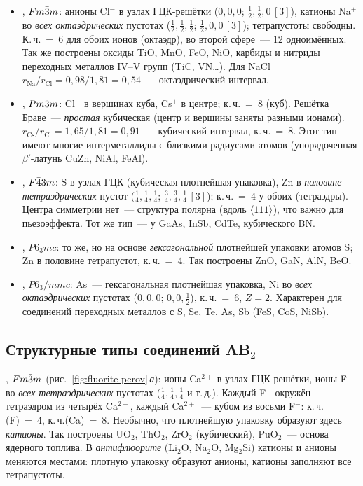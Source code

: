\begin{itemize}
\item {}, $Fm\bar{3}m$: анионы Cl$^-$ в узлах ГЦК-решётки ($0,0,0$;
$\frac12,\frac12,0\,[3]$), катионы Na$^+$ во \emph{всех октаэдрических} пустотах
($\frac12,\frac12,\frac12$; $\frac12,0,0\,[3]$); тетрапустоты свободны. К.\,ч.~=~6 для
обоих ионов (октаэдр), во второй сфере~— 12 одноимённых. Так же построены
оксиды TiO, MnO, FeO, NiO, карбиды и нитриды переходных металлов IV--V
групп (TiC, VN\ldots). Для NaCl $r_\text{Na}/r_\text{Cl}=0{,}98/1{,}81=0{,}54$~—
октаэдрический интервал.
\item {}, $Pm\bar{3}m$: Cl$^-$ в вершинах куба, Cs$^+$ в центре;
к.\,ч.~=~8 (куб). Решётка Браве~— \emph{простая} кубическая (центр и вершины
заняты разными ионами). $r_\text{Cs}/r_\text{Cl}=1{,}65/1{,}81=0{,}91$~— кубический
интервал, к.\,ч.~=~8. Этот тип имеют многие
интерметаллиды с близкими радиусами атомов (упорядоченная $\beta'$-латунь
CuZn, NiAl, FeAl).
\item {}, $F\bar{4}3m$: S в узлах ГЦК (кубическая плотнейшая
упаковка), Zn в \emph{половине тетраэдрических} пустот ($\frac14,\frac14,\frac14$;
$\frac34,\frac34,\frac14\,[3]$); к.\,ч.~=~4 у обоих (тетраэдры). Центра симметрии нет~—
структура полярна (вдоль $\langle 111\rangle$), что важно для пьезоэффекта. Тот же
тип~— у GaAs, InSb, CdTe, кубического BN.
\item {}, $P6_3mc$: то же, но на основе
\emph{гексагональной} плотнейшей упаковки атомов S; Zn в половине
тетрапустот, к.\,ч.~=~4. Так построены ZnO, GaN, AlN, BeO.
\item {}, $P6_3/mmc$: As~— гексагональная плотнейшая упаковка,
Ni во \emph{всех октаэдрических} пустотах ($0,0,0$; $0,0,\frac12$), к.\,ч.~=~6, $Z=2$.
Характерен для соединений переходных металлов с S, Se, Te, As, Sb (FeS, CoS,
NiSb).
\end{itemize}

\subsection{Структурные типы соединений AB$_2$}\label{ssec:ab2-types}

, $Fm\bar{3}m$ (рис.~\ref{fig:fluorite-perov}\,\textit{а}):
ионы Ca$^{2+}$ в узлах ГЦК-решётки, ионы F$^-$ во \emph{всех тетраэдрических}
пустотах ($\frac14,\frac14,\frac14$ и т.\,д.). Каждый F$^-$ окружён тетраэдром из четырёх
Ca$^{2+}$, каждый Ca$^{2+}$~— кубом из восьми F$^-$: к.\,ч.(F)~=~4, к.\,ч.(Ca)~=~8.
Необычно, что плотнейшую упаковку образуют здесь \emph{катионы}. Так
построены UO$_2$, ThO$_2$, ZrO$_2$ (кубический), PuO$_2$~— основа ядерного
топлива. В \emph{антифлюорите} (Li$_2$O, Na$_2$O, Mg$_2$Si) катионы и анионы
меняются местами: плотную упаковку образуют анионы, катионы заполняют все
тетрапустоты.

